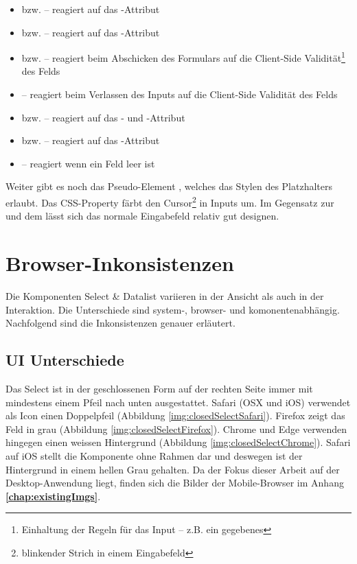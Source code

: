 \begin{itemize}
    \item {} bzw.  – reagiert auf das -Attribut
    \item {} bzw.  – reagiert auf das -Attribut
    \item {} bzw.  – reagiert beim Abschicken des Formulars auf die Client-Side Validität\footnote{
            Einhaltung der Regeln für das Input – z.B. ein gegebenes 
        } des Felds
    \item {} – reagiert beim Verlassen des Inputs auf die Client-Side Validität des Felds
    \item {} bzw.  – reagiert auf das - und -Attribut
    \item {} bzw.  – reagiert auf das -Attribut
    \item {} – reagiert wenn ein Feld leer ist
\end{itemize}

Weiter gibt es noch das Pseudo-Element , welches das Stylen des Platzhalters erlaubt. 
Das CSS-Property  färbt den Cursor\footnote{
    blinkender Strich in einem Eingabefeld
} in Inputs um. 
Im Gegensatz zur  und dem  lässt sich das normale Eingabefeld relativ gut designen. 


\clearpage
\section{Browser-Inkonsistenzen}
\label{sec:browserInconsistency}

Die Komponenten Select \& Datalist variieren in der Ansicht als auch in der Interaktion. 
Die Unterschiede sind system-, browser- und komonentenabhängig. 
Nachfolgend sind die Inkonsistenzen genauer erläutert. 


\subsection{UI Unterschiede}
\label{sec:uiDifferences}

Das Select ist in der geschlossenen Form auf der rechten Seite immer mit mindestens einem Pfeil nach unten ausgestattet. 
Safari (OSX und iOS) verwendet als Icon einen Doppelpfeil (Abbildung \ref{img:closedSelectSafari}). 
Firefox zeigt das Feld in grau (Abbildung \ref{img:closedSelectFirefox}). 
Chrome und Edge verwenden hingegen einen weissen Hintergrund (Abbildung \ref{img:closedSelectChrome}). 
Safari auf iOS stellt die Komponente ohne Rahmen dar und deswegen ist der Hintergrund in einem hellen Grau gehalten. 
Da der Fokus dieser Arbeit auf der Desktop-Anwendung liegt, finden sich die Bilder der Mobile-Browser im Anhang \textbf{\ref{chap:existingImgs}}. 

